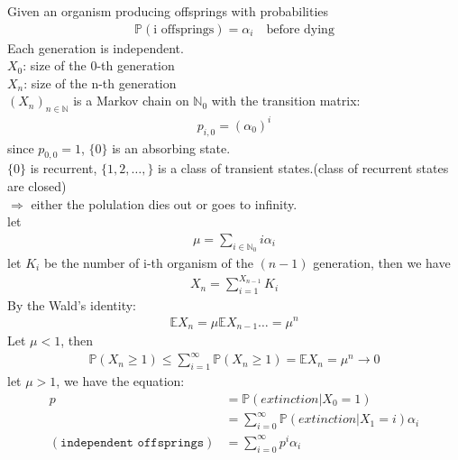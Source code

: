 \begin{example}
	Given an organism producing offsprings with probabilities
	\begin{align*}
		\mathbb{P}(\text{i offsprings}) = \alpha_i \quad \text{before dying}
	\end{align*}
	Each generation is independent.\\
	$X_0$: size of the 0-th generation\\
	$X_n$: size of the n-th generation\\
	$(X_n)_{n \in \mathbb{N}}$ is a Markov chain on $\mathbb{N}_0$ with the transition matrix:
	\begin{align*}
		p_{i, 0} = (\alpha_0)^i
	\end{align*}
	since $p_{0, 0} = 1$, $\{0\}$ is an absorbing state.\\
	$\{0\}$ is recurrent, $\{1, 2, \dots, \}$ is a class of transient states.(class of recurrent states are closed)\\
	$\Rightarrow$ either the polulation dies out or goes to infinity.\\
	let 
	\begin{align*}
		\mu= \sum_{i \in \mathbb{N}_0} i \alpha_i
	\end{align*}
	let $K_i$ be the number of i-th organism of the $(n-1)$ generation, then we have
	\begin{align*}
		X_n = \sum_{i = 1}^{X_{n-1}} K_i 
	\end{align*}
	By the Wald's identity:
	\begin{align*}
		\mathbb{E} X_n = \mu \mathbb{E} X_{n-1} \dots = \mu^n 
	\end{align*}
	Let $\mu < 1$, then 
	\begin{align*}
		\mathbb{P}(X_n \ge 1) \le \sum_{i = 1}^\infty \mathbb{P}(X_n \geq 1) = \mathbb{E}X_n = \mu^n \rightarrow 0
	\end{align*}
	let $\mu >1$, we have the equation:
	\begin{align*}
		p &= \mathbb{P}(extinction|X_0 = 1)\\ 
		&= \sum_{i = 0}^\infty \mathbb{P}(extinction|X_1 = i)\alpha_i\\
		(\texttt{independent offsprings})
		&= \sum_{i= 0}^\infty p^i \alpha _i
	\end{align*}
\end{example}

